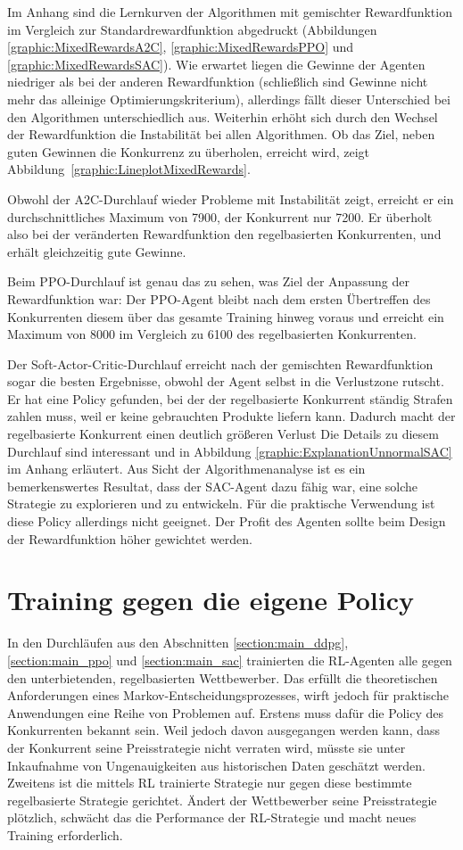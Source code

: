Im Anhang sind die Lernkurven der Algorithmen mit gemischter Rewardfunktion im Vergleich zur Standardrewardfunktion abgedruckt (Abbildungen \ref{graphic:MixedRewardsA2C}, \ref{graphic:MixedRewardsPPO} und \ref{graphic:MixedRewardsSAC}).
Wie erwartet liegen die Gewinne der Agenten niedriger als bei der anderen Rewardfunktion (schließlich sind Gewinne nicht mehr das alleinige Optimierungskriterium), allerdings fällt dieser Unterschied bei den Algorithmen unterschiedlich aus.
Weiterhin erhöht sich durch den Wechsel der Rewardfunktion die Instabilität bei allen Algorithmen.
Ob das Ziel, neben guten Gewinnen die Konkurrenz zu überholen, erreicht wird, zeigt \mbox{Abbildung \ref{graphic:LineplotMixedRewards}}.

Obwohl der A2C-Durchlauf wieder Probleme mit Instabilität zeigt, erreicht er ein durchschnittliches Maximum von 7900, der Konkurrent nur 7200.
Er überholt also bei der veränderten Rewardfunktion den regelbasierten Konkurrenten, und erhält gleichzeitig gute Gewinne.

Beim PPO-Durchlauf ist genau das zu sehen, was Ziel der Anpassung der Rewardfunktion war:
Der PPO-Agent bleibt nach dem ersten Übertreffen des Konkurrenten diesem über das gesamte Training hinweg voraus und erreicht ein Maximum von 8000 im Vergleich zu 6100 des regelbasierten Konkurrenten.

Der Soft-Actor-Critic-Durchlauf erreicht nach der gemischten Rewardfunktion sogar die besten Ergebnisse, obwohl der Agent selbst in die Verlustzone rutscht.
Er hat eine Policy gefunden, bei der der regelbasierte Konkurrent ständig Strafen zahlen muss, weil er keine gebrauchten Produkte liefern kann.
Dadurch macht der regelbasierte Konkurrent einen deutlich größeren Verlust
Die Details zu diesem Durchlauf sind interessant und in Abbildung \ref{graphic:ExplanationUnnormalSAC} im Anhang erläutert.
Aus Sicht der Algorithmenanalyse ist es ein bemerkenswertes Resultat, dass der SAC-Agent dazu fähig war, eine solche Strategie zu explorieren und zu entwickeln.
Für die praktische Verwendung ist diese Policy allerdings nicht geeignet.
Der Profit des Agenten sollte beim Design der Rewardfunktion höher gewichtet werden.

\section{Training gegen die eigene Policy}
\label{section:self_play}
In den Durchläufen aus den Abschnitten \ref{section:main_ddpg}, \ref{section:main_ppo} und \ref{section:main_sac} trainierten die RL-Agenten alle gegen den unterbietenden, regelbasierten Wettbewerber.
Das erfüllt die theoretischen Anforderungen eines Markov-Entscheidungsprozesses, wirft jedoch für praktische Anwendungen eine Reihe von Problemen auf.
Erstens muss dafür die Policy des Konkurrenten bekannt sein.
Weil jedoch davon ausgegangen werden kann, dass der Konkurrent seine Preisstrategie nicht verraten wird, müsste sie unter Inkaufnahme von Ungenauigkeiten aus historischen Daten geschätzt werden.
Zweitens ist die mittels RL trainierte Strategie nur gegen diese bestimmte regelbasierte Strategie gerichtet.
Ändert der Wettbewerber seine Preisstrategie plötzlich, schwächt das die Performance der RL-Strategie und macht neues Training erforderlich.

